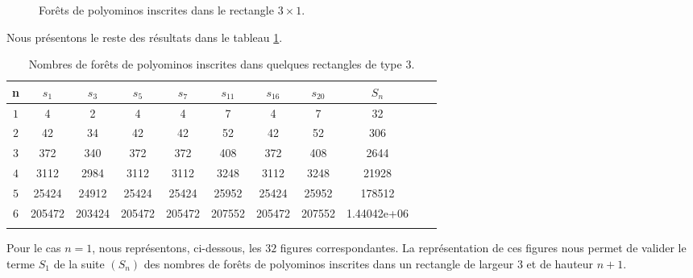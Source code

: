 \begin{figure}[!htb]
 \begin{minipage}[c]{.26\linewidth}
  \centering
  \end{minipage}
  \hfill
  \begin{minipage}[c]{.36\linewidth}
  \centering
\begin{logicpuzzle}[rows=1,columns=3,color=cyan!100, width=750px,scale=0.5]
\framepuzzle[black!50]
\end{logicpuzzle}
\end{minipage}
\hfill
\begin{minipage}[c]{.36\linewidth}
  \centering
\begin{logicpuzzle}[rows=1,columns=3,color=cyan!100, width=750px,scale=0.5]
\framepuzzle[black!50]
\end{logicpuzzle}
\end{minipage}
\caption{\label{uniF3} Forêts de polyominos inscrites dans le rectangle $3\times 1$.}
\end{figure} 
 Nous présentons le reste des résultats dans le tableau \ref{v4}.
\begin{tiny}
\begin{longtable}{|c|c|c|c|c|c|c|c|c|c|c|} 
\hline
n&$s_{1}$&$s_{3}$&$s_{5}$&$s_{7}$&$s_{11}$&$s_{16}$&$s_{20}$&$S_{n}$\\
\hline
$1$&4
 & 2
& 4& 4
& 7
&4
 & 7&32\\
\hline
$2$&
42 &34
 &42
 &42
 & 52 &42 & 52 &306\\
\hline
$3$& 372 
& 340
 &372 
 & 372 
& 408
& 372 
&408
 &2644
\\
\hline
$4$&  3112
& 2984

 & 3112

 & 3112
& 3248

& 3112

& 3248

 &  21928

\\
\hline
$5$&  
25424
& 24912
&25424
& 25424
& 25952
&25424
& 25952
&  178512
\\
\hline
$6$
& 205472
& 203424
&205472
& 205472
& 207552
& 205472
& 207552
& 1.44042e+06
\\
\hline
\caption{\label{v4} Nombres de forêts de polyominos inscrites dans quelques rectangles de type $3$.}
\end{longtable}
\end{tiny} 
 
Pour le cas $n=1$, nous représentons, ci-dessous, les $32$ figures correspondantes. La représentation de ces figures nous permet de valider le terme $S_{1}$  de la suite  $(S_{n})$ des nombres de forêts de polyominos inscrites dans un rectangle de largeur $3$ et de hauteur $n+1$. 

